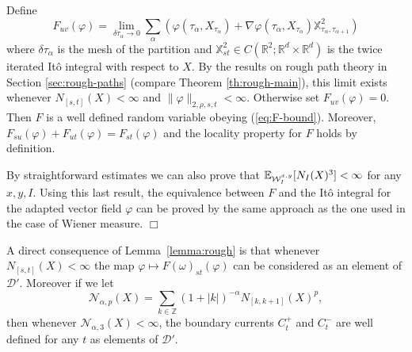 \documentclass[a4paper,11pt]{article}
\newenvironment{proof}[1][Proof]{{\sc #1.} }{\hfill $\Box$}
\newcommand{\expect}{\mathbb{E}}
\newcommand{\R}{\mathbb{R}}
\newcommand {\D}  {\ensuremath {\mathcal{D}}}
\newcommand{\W}{\mathop{\mathrm{{\cal W}}}\nolimits}
\newcommand {\Z} {\mathbb{Z}}
\begin{document}
\begin{proof}
Define
\begin{equation*}
F_{uv}(\varphi) = 
\lim_{\delta\tau_\alpha \to 0} 
\sum_\alpha \left(\varphi(\tau_\alpha,X_{\tau_\alpha}) 
+ \nabla \varphi(\tau_\alpha,X_{\tau_\alpha}) 
\mathbb{X}^2_{\tau_\alpha,\tau_{\alpha+1}}\right)
\end{equation*}
where  $\delta\tau_\alpha$ is the mesh of the partition and 
$\mathbb{X}^2_{st}\in C(\R^2;\R^d \times \R^d)$ is the 
twice iterated It\^o integral with respect to $X$. By the results 
on rough path theory in Section \ref{sec:rough-paths} (compare 
Theorem \ref{th:rough-main}), this limit exists whenever 
$N_{[s,t]}(X)<\infty$ and $\|\varphi\|_{2,\rho,s,t}<\infty$. Otherwise 
set $F_{uv}(\varphi) = 0$. Then $F$ is a well defined random variable 
obeying (\ref{eq:F-bound}). Moreover,  $F_{su}(\varphi)+F_{ut}
(\varphi)= F_{st}(\varphi)$ and the locality property for $F$ holds
by definition.

By straightforward estimates we can also prove that 
$\expect_{\W^{x,y}_I} [N_I(X)^3] < \infty$ for any $x,y,I$. Using
this last result, the equivalence between $F$ and the It\^o integral 
for the adapted vector field $\varphi$ can be proved by the same 
approach as the one used in the case of Wiener measure.
\end{proof}


A direct consequence of Lemma~\ref{lemma:rough} is that whenever 
$N_{[s,t]}(X) < \infty$ the map $\varphi \mapsto F(\omega)_{st}
(\varphi)$ can be considered as an element of $\D'$. Moreover if 
we let
$$
\mathcal{N}_{\alpha,p}(X) = \sum_{k \in \Z} (1+|k|)^{-\alpha} 
N_{[k,k+1]}(X)^p,
$$
then whenever $\mathcal{N}_{\alpha,3}(X) < \infty$, the boundary 
currents $C^+_t$ and $C^-_t$ are well defined for any $t$ as elements 
of $\D'$.
\end{document}
